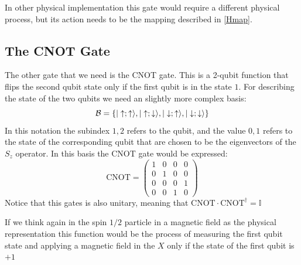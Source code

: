 In other physical implementation this gate would require a different physical process, but its action needs to be the mapping described in \eqref{Hmap}.


\subsection{The CNOT Gate}
The other gate that we need is the CNOT gate. This is a 2-qubit function that flips the second qubit state only if the first qubit is in the state $1$. For describing the state of the two qubits we need an slightly more complex basis:
\begin{equation}
  \mathcal{B}=
  \left\{|\uparrow;\uparrow\rangle,|\uparrow;\downarrow\rangle,|\downarrow;\uparrow\rangle,|\downarrow;\downarrow\rangle\right\}
\end{equation}
 In this notation the subindex $1,2$ refers to the qubit, and the value $0,1$ refers to the state of the corresponding qubit that are chosen to be the eigenvectors of the $S_z$ operator.
In this basis the CNOT gate would be expressed:
\begin{equation}
  \text{CNOT}=\left(\begin{array}{cc|cc}
  1 & 0 & 0 & 0 \\
  0 & 1 & 0 & 0 \\\hline
  0 & 0 & 0 & 1 \\
  0 & 0 & 1 & 0
  \end{array}\right)
\end{equation}
Notice that this gates %
is also unitary, meaning that $\text{CNOT}\cdot\text{CNOT}^{\dagger}=\mathbb{I}$


If we think again in the spin $1/2$ particle in a magnetic field as the physical representation this function would be the process of measuring the first qubit state and applying a magnetic field in the $X$ only if the state of the first qubit is $+1$

